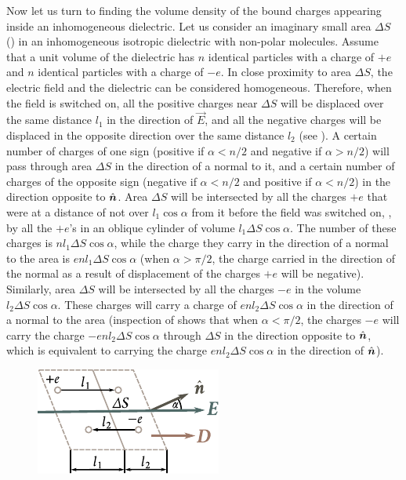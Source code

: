 Now let us turn to finding the volume density of the bound charges appearing inside an inhomogeneous dielectric. Let us consider an imaginary small area $\Delta{S}$ () in an inhomogeneous isotropic dielectric with non-polar molecules.
Assume that a unit volume of the dielectric has $n$ identical particles with a charge of $+e$ and $n$ identical particles with a charge of $-e$. In close proximity to area $\Delta{S}$, the electric field and the dielectric can be considered homogeneous.
Therefore, when the field is switched on, all the positive charges near $\Delta{S}$ will be displaced over the same distance $l_1$ in the direction of $\vec{E}$, and all the negative charges will be displaced in the opposite direction over the same distance $l_2$ (see ).
A certain number of charges of one sign (positive if $\alpha<n/2$ and negative if $\alpha>n/2$) will pass through area $\Delta{S}$ in the direction of a normal to it, and a certain number of charges of the opposite sign (negative if $\alpha<n/2$ and positive if $\alpha<n/2$) in the direction opposite to $\hat{\boldsymbol{n}}$.
Area $\Delta{S}$ will be intersected by all the charges $+e$ that were at a distance of not over $l_1\cos\alpha$ from it before the field was switched on, \ie, by all the $+e$'s in an oblique cylinder of volume $l_1\Delta{S}\cos\alpha$. The number of these charges is $nl_1\Delta{S}\cos\alpha$, while the charge they carry in the direction of a normal to the area is $enl_1\Delta{S}\cos\alpha$ (when $\alpha>\pi/2$, the charge carried in the direction of the normal as a result of displacement of the charges $+e$ will be negative).
Similarly, area $\Delta{S}$ will be intersected by all the charges $-e$ in the volume $l_2\Delta{S}\cos\alpha$. These charges will carry a charge of $enl_2\Delta{S}\cos\alpha$ in the direction of a normal to the area (inspection of  shows that when $\alpha<\pi/2$, the charges $-e$ will carry the charge $-enl_2\Delta{S}\cos\alpha$ through $\Delta{S}$ in the direction opposite to $\hat{\boldsymbol{n}}$, which is equivalent to carrying the charge $enl_2\Delta{S}\cos\alpha$ in the direction of $\hat{\boldsymbol{n}}$).

\begin{figure}[t]
	\begin{center}
		\includegraphics[scale=1.1]{figures/ch_02/fig_2_3.pdf}
		\caption[]{}
		\label{fig:2_3}
	\end{center}
	\vspace{-0.8cm}
\end{figure}

